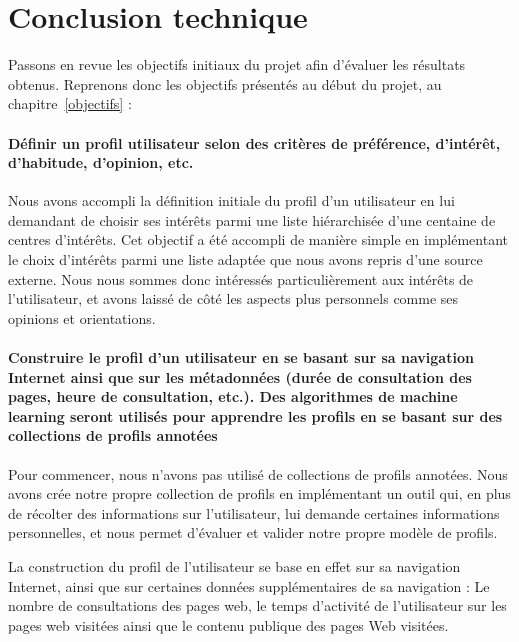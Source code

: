 

\section{Conclusion technique}

	Passons en revue les objectifs initiaux du projet afin d'évaluer les résultats obtenus. Reprenons donc les objectifs présentés au début du projet, au chapitre~\ref{objectifs} :

	\paragraph{Définir un profil utilisateur selon des critères de préférence, d’intérêt, d’habitude, d’opinion, etc.}

		Nous avons accompli la définition initiale du profil d'un utilisateur en lui demandant de choisir ses intérêts parmi une liste hiérarchisée d'une centaine de centres d'intérêts. Cet objectif a été accompli de manière simple en implémentant le choix d'intérêts parmi une liste adaptée que nous avons repris d'une source externe. Nous nous sommes donc intéressés particulièrement aux intérêts de l'utilisateur, et avons laissé de côté les aspects plus personnels comme ses opinions et orientations.

	\paragraph{Construire le profil d'un utilisateur en se basant sur sa navigation Internet ainsi que sur les métadonnées (durée de consultation des pages, heure de consultation, etc.). Des algorithmes de machine learning seront utilisés pour apprendre les profils en se basant sur des collections de profils annotées}

		Pour commencer, nous n'avons pas utilisé de collections de profils annotées. Nous avons crée notre propre collection de profils en implémentant un outil qui, en plus de récolter des informations sur l'utilisateur, lui demande certaines informations personnelles, et nous permet d'évaluer et valider notre propre modèle de profils.

		La construction du profil de l'utilisateur se base en effet sur sa navigation Internet, ainsi que sur certaines données supplémentaires de sa navigation : Le nombre de consultations des pages web, le temps d'activité de l'utilisateur sur les pages web visitées ainsi que le contenu publique des pages Web visitées.

